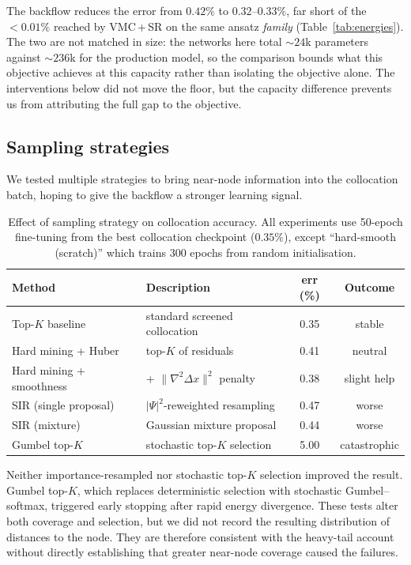 The backflow reduces the error from $0.42\%$ to $0.32$--$0.33\%$, far short
of the ${<}0.01\%$ reached by VMC\,+\,SR on the same ansatz \emph{family}
(Table~\ref{tab:energies}). The two are not matched in size: the networks here total
${\sim}24$k parameters against ${\sim}236$k for the production model, so the comparison
bounds what this objective achieves at this capacity rather than isolating the objective
alone. The interventions below did not move the floor, but the capacity difference prevents
us from attributing the full gap to the objective.

\subsection{Sampling strategies}
\label{app:catch22:sampling}

We tested multiple strategies to bring near-node information into the
collocation batch, hoping to give the backflow a stronger learning signal.

\begin{table}[htbp]
\centering
\caption[Effect of sampling strategy on collocation accuracy]{Effect of sampling strategy on collocation accuracy.
All experiments use 50-epoch fine-tuning from the best
collocation checkpoint ($0.35\%$), except ``hard-smooth (scratch)''
which trains 300 epochs from random initialisation.}
\label{tab:c22:sampling}
\begin{tabular}{l l c c}
\toprule
Method & Description & err (\%) & Outcome \\
\midrule
Top-$K$ baseline & standard screened collocation & 0.35 & stable \\
Hard mining + Huber & top-$K$ of residuals & 0.41 & neutral \\
Hard mining + smoothness & + $\|\nabla^2\Delta x\|^2$ penalty & 0.38 & slight help \\
SIR (single proposal) & $|\Psi|^2$-reweighted resampling & 0.47 & worse \\
SIR (mixture) & Gaussian mixture proposal & 0.44 & worse \\
Gumbel top-$K$~\cite{JangGuPoole2017-GumbelSoftmax} & stochastic top-$K$ selection & 5.00 & catastrophic \\
\bottomrule
\end{tabular}
\end{table}

Neither importance-resampled nor stochastic top-$K$ selection improved the result.
Gumbel top-$K$, which replaces deterministic selection with stochastic
Gumbel--softmax, triggered early stopping after rapid energy divergence. These tests
alter both coverage and selection, but we did not record the resulting distribution of
distances to the node. They are therefore consistent with the heavy-tail account without
directly establishing that greater near-node coverage caused the failures.

